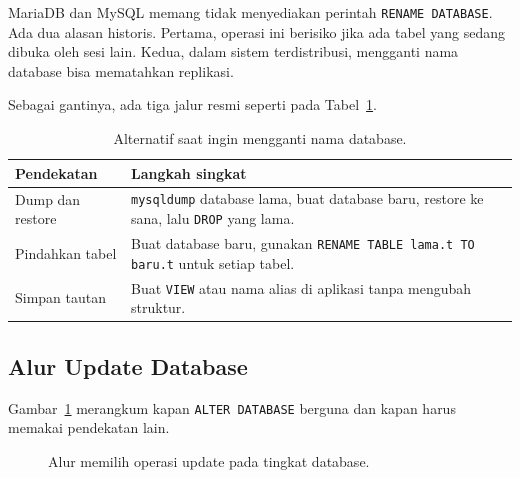 \documentclass[11pt,a4paper]{article}
\begin{document}
MariaDB dan MySQL memang tidak menyediakan perintah \texttt{RENAME DATABASE}. Ada dua alasan historis. Pertama, operasi ini berisiko jika ada tabel yang sedang dibuka oleh sesi lain. Kedua, dalam sistem terdistribusi, mengganti nama database bisa mematahkan replikasi.

Sebagai gantinya, ada tiga jalur resmi seperti pada Tabel~\ref{tab:rename-alt}.

\begin{table}[H]
	\centering
	\caption{Alternatif saat ingin mengganti nama database.}
	\label{tab:rename-alt}
	\small
	\begin{tabularx}{\textwidth}{l X}
		\toprule
		Pendekatan       & Langkah singkat                                                                                      \\
		\midrule
		Dump dan restore & \texttt{mysqldump} database lama, buat database baru, restore ke sana, lalu \texttt{DROP} yang lama. \\
		Pindahkan tabel  & Buat database baru, gunakan \texttt{RENAME TABLE lama.t TO baru.t} untuk setiap tabel.               \\
		Simpan tautan    & Buat \texttt{VIEW} atau nama alias di aplikasi tanpa mengubah struktur.                              \\
		\bottomrule
	\end{tabularx}
\end{table}

\subsection{Alur Update Database}

Gambar~\ref{fig:alter-flow} merangkum kapan \texttt{ALTER DATABASE} berguna dan kapan harus memakai pendekatan lain.

\begin{figure}[H]
	\centering
	\caption{Alur memilih operasi update pada tingkat database.}
	\label{fig:alter-flow}
\end{figure}
\end{document}
